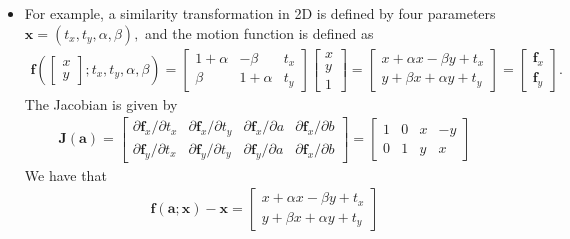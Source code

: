 \documentclass[10pt]{article}
\newcommand{\ve}[1]{\mathbf{#1}}
\begin{document}
\begin{itemize}
	  \item For example, a similarity transformation in 2D is 
	    defined by four parameters $\ve{x} = (t_x, t_y, \alpha, \beta),$ and the
	    motion function is defined as
	    \begin{align*}
	      \ve{f}\left( 
	      \begin{bmatrix} x \\ y \end{bmatrix}; t_x, t_y, \alpha, \beta \right)
	      = \begin{bmatrix} 
	          1+\alpha & -\beta & t_x \\ 
	          \beta & 1+\alpha & t_y 	        
          \end{bmatrix}
	      \begin{bmatrix} x \\ y \\ 1 \end{bmatrix}
	      = \begin{bmatrix} 
	          x + \alpha x - \beta y + t_x \\ 
	          y + \beta x + \alpha y  + t_y	          
          \end{bmatrix}
	      = \begin{bmatrix} \ve{f}_x \\ \ve{f}_y \end{bmatrix}.
	    \end{align*}
	    The Jacobian is given by
	    \begin{align*}
	      \ve{J}(\ve{\ve{a}}) = 
	      \begin{bmatrix} 
	        \partial \ve{f}_x / \partial{t_x} & \partial \ve{f}_x / \partial{t_y} & \partial \ve{f}_x / \partial{a} & \partial \ve{f}_x / \partial{b}\\
	        \partial \ve{f}_y / \partial{t_x} & \partial \ve{f}_y / \partial{t_y} & \partial \ve{f}_y / \partial{a} & \partial \ve{f}_x / \partial{b}
	      \end{bmatrix}
	      =
	      \begin{bmatrix} 
	        1 & 0 & x & -y\\
	        0 & 1 & y & x
	      \end{bmatrix}
	    \end{align*}
	    We have that
	    \begin{align*}
	      \ve{f}(\ve{a};\ve{x}) - \ve{x} 
	      = \begin{bmatrix} 
	        x + \alpha x - \beta y + t_x \\ 
	        y + \beta x + \alpha y  + t_y	      

\end{bmatrix}
\end{align*}
\end{itemize}
\end{document}
